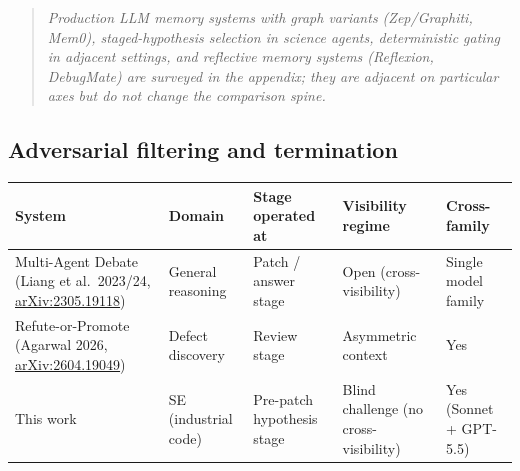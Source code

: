 \documentclass[
  10pt,
]{article}
\newcounter{none} %
\begin{document}
\begin{quote}
\emph{Production LLM memory systems with graph variants (Zep/Graphiti,
Mem0), staged-hypothesis selection in science agents, deterministic
gating in adjacent settings, and reflective memory systems (Reflexion,
DebugMate) are surveyed in the appendix; they are adjacent on particular
axes but do not change the comparison spine.}
\end{quote}

\subsection{Adversarial filtering and
termination}\label{adversarial-termination}

{\def\LTcaptype{none} %
\begin{longtable}[]{@{}
  >{\raggedright\arraybackslash}p{}
  >{\raggedright\arraybackslash}p{}
  >{\raggedright\arraybackslash}p{}
  >{\raggedright\arraybackslash}p{}
  >{\raggedright\arraybackslash}p{}@{}}
\toprule\noalign{}
\begin{minipage}[b]{\linewidth}\raggedright
System
\end{minipage} & \begin{minipage}[b]{\linewidth}\raggedright
Domain
\end{minipage} & \begin{minipage}[b]{\linewidth}\raggedright
Stage operated at
\end{minipage} & \begin{minipage}[b]{\linewidth}\raggedright
Visibility regime
\end{minipage} & \begin{minipage}[b]{\linewidth}\raggedright
Cross-family
\end{minipage} \\
\midrule\noalign{}
\endhead
\bottomrule\noalign{}
\endlastfoot
Multi-Agent Debate (Liang et al.~2023/24,
\href{https://arxiv.org/abs/2305.19118}{arXiv:2305.19118}) & General
reasoning & Patch / answer stage & Open (cross-visibility) & Single
model family \\
Refute-or-Promote (Agarwal 2026,
\href{https://arxiv.org/abs/2604.19049}{arXiv:2604.19049}) & Defect
discovery & Review stage & Asymmetric context & Yes \\
This work & SE (industrial code) & Pre-patch hypothesis stage & Blind
challenge (no cross-visibility) & Yes (Sonnet + GPT-5.5) \\
\end{longtable}
}
\end{document}
